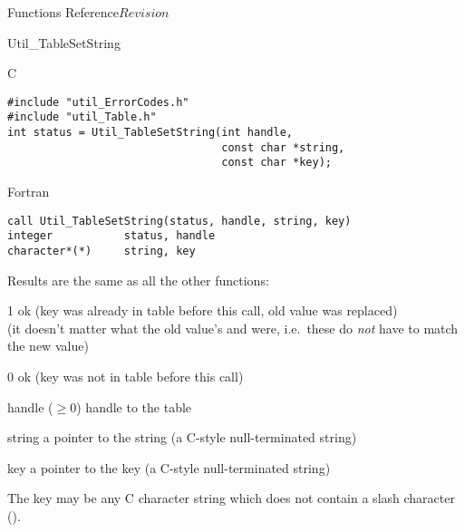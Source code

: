 \begin{cactuspart}{ Functions Reference}{}{$Revision$}
\begin{FunctionDescription}{Util\_TableSetString}
\begin{SynopsisSection}
\begin{Synopsis}{C}
\begin{verbatim}
#include "util_ErrorCodes.h"
#include "util_Table.h"
int status = Util_TableSetString(int handle,
                                 const char *string,
                                 const char *key);
\end{verbatim}
\end{Synopsis}
\begin{Synopsis}{Fortran}
\begin{verbatim}
call Util_TableSetString(status, handle, string, key)
integer           status, handle
character*(*)     string, key
\end{verbatim}
\end{Synopsis}
\end{SynopsisSection}

\begin{ResultSection}
\begin{ResultNote}
Results are the same as all the other  functions:
\end{ResultNote}
\begin{Result}{\rm 1}
ok (key was already in table before this call, old value was replaced)\\
   (it doesn't matter what the old value's  and
     were, i.e.\ these do {\em not\/} have to match
    the new value)
\end{Result}
\begin{Result}{\rm 0}
ok (key was not in table before this call)
\end{Result}
\end{ResultSection}

\begin{ParameterSection}
\begin{Parameter}{handle ($\ge 0$)}
handle to the table
\end{Parameter}
\begin{Parameter}{string}
a pointer to the string (a C-style null-terminated string)
\end{Parameter}
\begin{Parameter}{key}
a pointer to the key (a C-style null-terminated string)
\end{Parameter}
\end{ParameterSection}

\begin{Discussion}
The key may be any C character string which does not contain a slash
character ().


\end{Discussion}
\end{FunctionDescription}
\end{cactuspart}
